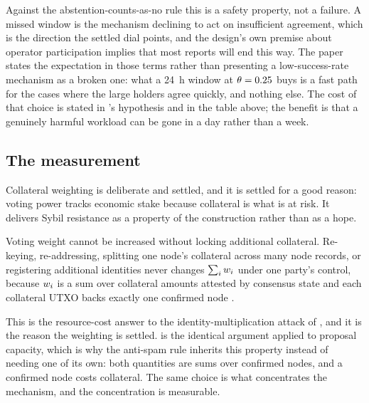 Against the abstention-counts-as-no rule this is a safety property, not a failure. A missed window
is the mechanism declining to act on insufficient agreement, which is the direction the settled dial
points, and the design's own premise about operator participation implies that most reports will
end this way. The paper states the expectation in those terms rather than presenting a
low-success-rate mechanism as a broken one: what a \SI{24}{\hour} window at
$\theta = 0.25$ buys is a fast path for the cases where the large holders agree quickly, and
nothing else. The cost of that choice is stated in 's hypothesis and in the
table above; the benefit is that a genuinely harmful workload can be gone in a day rather than a
week.

\subsection{The measurement}
\label{sec:23:measurement}

Collateral weighting is deliberate and settled, and it is settled for a good reason: voting power
tracks economic stake because collateral is what is at risk. It delivers Sybil resistance as a
property of the construction rather than as a hope.

\begin{property}
\label{prop:23:sybil}
Voting weight cannot be increased without locking additional collateral. Re-keying, re-addressing,
splitting one node's collateral across many node records, or registering additional identities
never changes $\sum_i w_{i}$ under one party's control, because $w_{i}$ is a sum over
collateral amounts attested by consensus state and each collateral UTXO backs exactly one confirmed
node .
\end{property}

This is the resource-cost answer to the identity-multiplication attack of
\citet{douceur2002sybil}, and it is the reason the weighting is settled.
 is the identical argument applied to proposal capacity, which is why the
anti-spam rule inherits this property instead of needing one of its own: both quantities are sums
over confirmed nodes, and a confirmed node costs collateral. The same choice is what
concentrates the mechanism, and the concentration is measurable.

